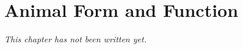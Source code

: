 \chapter{Animal Form and Function}\label{ch:b1:animal-form}


\emph{This chapter has not been written yet.}
